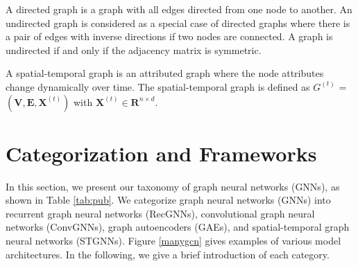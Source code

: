 	
	\begin{definition}
		A directed graph is a graph with all edges directed from one node to another. An undirected graph is considered as a special case of directed graphs where there is a pair of edges with inverse directions if two nodes are connected. A graph is undirected if and only if the adjacency matrix is symmetric.
	\end{definition}
	
	
	
	\begin{definition}
		A spatial-temporal graph is an attributed graph where the node attributes change dynamically over time.  The spatial-temporal graph is defined as $G^{(t)}$ = $(\mathbf{V},\mathbf{E},\mathbf{X}^{(t)})$ with $\mathbf{X}^{(t)} \in \mathbf{R}^{n\times d}$.
	\end{definition}


	\section{Categorization and  Frameworks}\label{sec:categorization}
	In this section, we present our taxonomy of graph neural networks (GNNs), as shown in Table \ref{tab:pub}. We categorize graph neural networks (GNNs) into recurrent graph neural  networks (RecGNNs), convolutional graph neural networks (ConvGNNs), graph autoencoders (GAEs), and  spatial-temporal graph neural networks (STGNNs). Figure \ref{manygcn} gives examples of various model architectures. %
	In the following, we give a brief introduction of each category.

